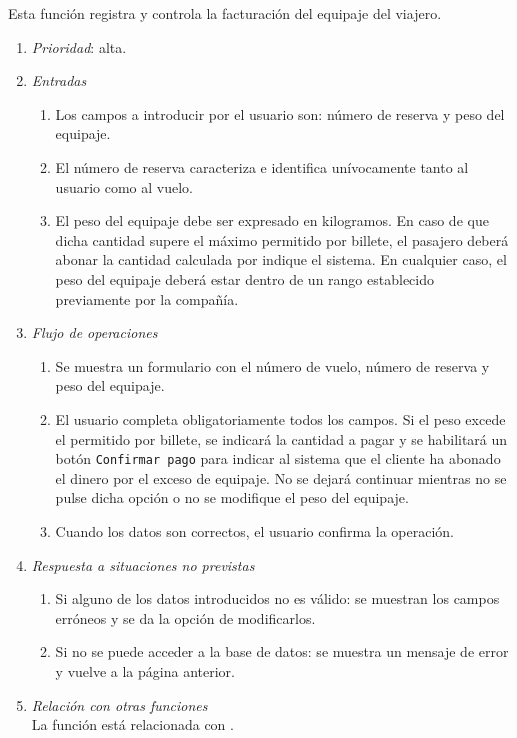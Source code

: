 

 \label{fun:facturar}
	Esta función registra y controla la facturación del equipaje del viajero.

	\begin{enumerate}
		\item \textit{Prioridad}: alta.
		\item \textit{Entradas}
			\begin{enumerate}
				\item Los campos a introducir por el usuario son: número de reserva y peso del equipaje.
				\item El número de reserva caracteriza e identifica unívocamente tanto al usuario como al vuelo.
				\item El peso del equipaje debe ser expresado en kilogramos. En caso de que dicha cantidad supere el máximo permitido por billete, el pasajero deberá abonar la cantidad calculada por indique el sistema. En cualquier caso, el peso del equipaje deberá estar dentro de un rango establecido previamente por la compañía.
			\end{enumerate}
		\item \textit{Flujo de operaciones}
			\begin{enumerate}
				\item Se muestra un formulario con el número de vuelo, número de reserva y peso del equipaje.
				\item El usuario completa obligatoriamente todos los campos. Si el peso excede el permitido por billete, se indicará la cantidad a pagar y se habilitará un botón \verb|Confirmar pago| para indicar al sistema que el cliente ha abonado el dinero por el exceso de equipaje. No se dejará continuar mientras no se pulse dicha opción o no se modifique el peso del equipaje.
				\item Cuando los datos son correctos, el usuario confirma la operación.
			\end{enumerate}
		\item \textit{Respuesta a situaciones no previstas}
			\begin{enumerate}
				\item Si alguno de los datos introducidos no es válido: se muestran los campos erróneos y se da la opción de modificarlos.
				\item Si no se puede acceder a la base de datos: se muestra un mensaje de error y vuelve a la página anterior.
			\end{enumerate}
		\item \textit{Relación con otras funciones}\\
		La función está relacionada con .		
	\end{enumerate}	
